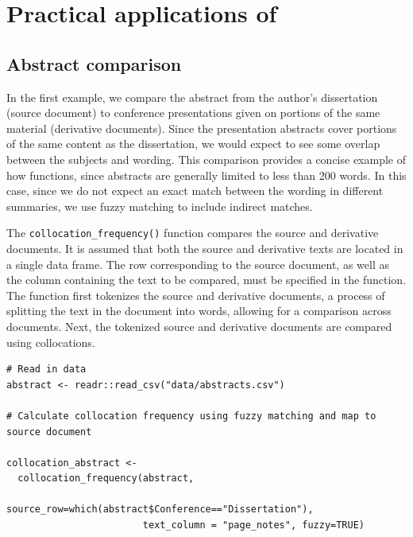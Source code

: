 \section{\texorpdfstring{Practical applications of }{Practical applications of }}\label{practical-applications-of}

\subsection{Abstract comparison}\label{abstract-comparison}

In the first example, we compare the abstract from the author's dissertation \citep{diss} (source document) to conference presentations given on portions of the same material (derivative documents).
Since the presentation abstracts cover portions of the same content as the dissertation, we would expect to see some overlap between the subjects and wording.
This comparison provides a concise example of how  functions, since abstracts are generally limited to less than 200 words.
In this case, since we do not expect an exact match between the wording in different summaries, we use fuzzy matching to include indirect matches.

The \texttt{collocation\_frequency()} function compares the source and derivative documents.
It is assumed that both the source and derivative texts are located in a single data frame.
The row corresponding to the source document, as well as the column containing the text to be compared, must be specified in the function.
The function first tokenizes the source and derivative documents, a process of splitting the text in the document into words, allowing for a comparison across documents.
Next, the tokenized source and derivative documents are compared using collocations.

\begin{verbatim}
# Read in data
abstract <- readr::read_csv("data/abstracts.csv")

# Calculate collocation frequency using fuzzy matching and map to source document

collocation_abstract <- 
  collocation_frequency(abstract, 
                        source_row=which(abstract$Conference=="Dissertation"), 
                        text_column = "page_notes", fuzzy=TRUE)
\end{verbatim}

